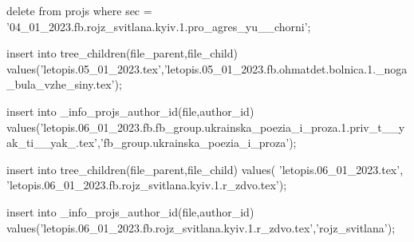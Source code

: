  
 
 
 
 

delete from projs where sec = '04_01_2023.fb.rojz_svitlana.kyiv.1.pro_agres_yu__chorni';

insert into tree_children(file_parent,file_child) values('letopis.05_01_2023.tex','letopis.05_01_2023.fb.ohmatdet.bolnica.1._noga_bula_vzhe_siny.tex');

insert into _info_projs_author_id(file,author_id)
values('letopis.06_01_2023.fb.fb_group.ukrainska_poezia_i_proza.1.priv_t__yak_ti__yak_.tex','fb_group.ukrainska_poezia_i_proza');

insert into tree_children(file_parent,file_child) values(
'letopis.06_01_2023.tex',
'letopis.06_01_2023.fb.rojz_svitlana.kyiv.1.r_zdvo.tex');

insert into _info_projs_author_id(file,author_id)
values('letopis.06_01_2023.fb.rojz_svitlana.kyiv.1.r_zdvo.tex','rojz_svitlana');

